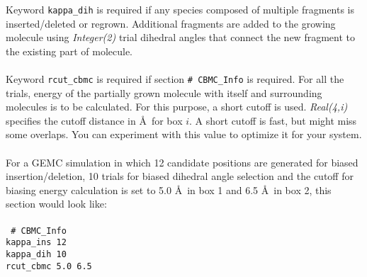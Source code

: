 %
Keyword {\tt kappa\_dih} is required 
if any species composed of multiple fragments is inserted/deleted or regrown.
Additional fragments are added to the growing molecule
using {\it Integer(2)} trial dihedral angles that connect the new fragment to the existing part of molecule. \\ \\
%
Keyword {\tt rcut\_cbmc} is required if section {\tt \# CBMC\_Info} is required.
For all the trials, energy of the partially grown molecule with itself and surrounding molecules is to be calculated. 
For this purpose, a short cutoff is used. {\it Real(4,i)} specifies the cutoff distance in \AA\ for box $i$. 
A short cutoff is fast, but might miss some overlaps. You can experiment with this value to optimize it for your system.\\ \\
%
For a GEMC simulation in which 12 candidate positions are generated for biased insertion/deletion, 10 trials for
biased dihedral angle selection and the cutoff for biasing energy calculation is set to 5.0 \AA\ in box 1 and 6.5 \AA\
in box 2, this section would look like: \\ \\
%
\texttt{
\# CBMC\_Info \\
kappa\_ins   12 \\
kappa\_dih   10 \\
rcut\_cbmc   5.0 6.5}
%
%
%
